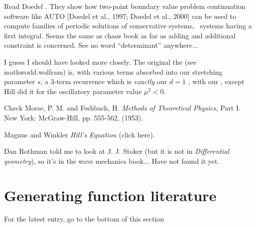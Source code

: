 \begin{description}
{Read Doedel \etal{} . They
show how two-point boundary value problem continuation software like AUTO
[Doedel et al., 1997; Doedel et al., 2000] can be used to compute
families of periodic solutions of conservative systems, \ie\ systems
having a first integral. Seems the same as chaos book as far as adding
and additional constraint is concerned. See no word ``determinant''
anywhere...
    }


     {
I guess I should have looked more closely. The original the {\HillDet}
(see 
{mathworld.wolfram}) is, with various terms absorbed into our
stretching parameter ${s}$, a 3-term recurrence which is \emph{exactly} our
$d=1$ \templatt, with our {\HillDet}, except Hill did it for the
oscillatory parameter value ${\mu}^2<0$.

Check Morse, P. M. and Feshbach, H.
\emph{Methods of Theoretical Physics}, Part I.
New York: McGraw-Hill, pp. 555-562, (1953).

Magnus and Winkler {\em Hill's Equation}
 {(click here)}.

Dan Rothman told me to look at J. J. Stoker (but it is not in {\em
Differential geometry}), so it's in the wave mechanics book...
Have not found it yet.
    }

\end{description}


\newpage
\section{Generating function literature}
\label{sect:GenFuncLit}


\hfill   {\color{red} For the latest entry, go to the bottom of this section}

\bigskip


